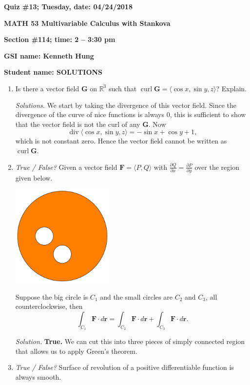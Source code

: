 \documentclass{article}
\newcommand{\rr}{\mathbf{r}}
\DeclareMathOperator{\curl}{curl}
\DeclareMathOperator{\divv}{div}
\begin{document}
{\bf Quiz \#13; Tuesday, date: 04/24/2018}

{\bf MATH 53 Multivariable Calculus with Stankova}

{\bf Section \#114; time: 2 -- 3:30 pm}

{\bf GSI name: Kenneth Hung}

{\bf Student name: SOLUTIONS}

\vspace*{0.25in}

\begin{enumerate}
\item Is there a vector field $\mathbf{G}$ on $\mathbb{R}^3$ such that $\curl \mathbf{G} = \langle \cos x, \sin y, z \rangle$? Explain.

{\em Solutions.} We start by taking the divergence of this vector field. Since the divergence of the curve of nice functions is always $0$, this is sufficient to show that the vector field is not the curl of any $\mathbf{G}$. Now
\[
\divv \langle \cos x, \sin y, z \rangle = -\sin x + \cos y + 1,
\]
which is not constant zero. Hence the vector field cannot be written as $\curl \mathbf{G}$.

\item {\em True / False?} Given a vector field $\mathbf{F} = \langle P, Q \rangle$ with $\frac{\partial Q}{\partial x} = \frac{\partial P}{\partial y}$ over the region given below.
\begin{center}
\includegraphics[width=0.4\textwidth]{quiz13dis114pic}
\end{center}
Suppose the big circle is $C_1$ and the small circles are $C_2$ and $C_3$, all counterclockwise, then
\[
\int_{C_1} \mathbf{F} \cdot d\rr = \int_{C_2} \mathbf{F} \cdot d\rr + \int_{C_3} \mathbf{F} \cdot d\rr.
\]

{\em Solution.} {\bf True.} We can cut this into three pieces of simply connected region that allows us to apply Green's theorem.

\item {\em True / False?} Surface of revolution of a positive differentiable function is always smooth.


\end{enumerate}
\end{document}
